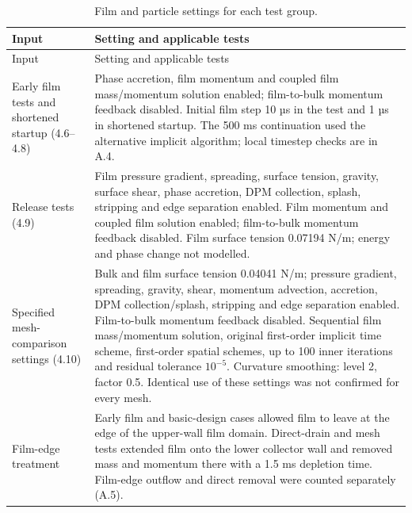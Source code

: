 \documentclass[12pt]{article}
\begin{document}
\begingroup\small\setlength{\tabcolsep}{3pt}
{
\renewcommand{\thetable}{A1c}
\begin{longtable}[]{@{}
  >{\raggedright\arraybackslash}p{}
  >{\raggedright\arraybackslash}p{}@{}}
\caption{Film and particle settings for each test group.}\label{tab:A1c}\tabularnewline
\toprule\noalign{}
\begin{minipage}[b]{\linewidth}\raggedright
Input
\end{minipage} & \begin{minipage}[b]{\linewidth}\raggedright
Setting and applicable tests
\end{minipage} \\
\midrule\noalign{}
\endfirsthead
\toprule\noalign{}
\begin{minipage}[b]{\linewidth}\raggedright
Input
\end{minipage} & \begin{minipage}[b]{\linewidth}\raggedright
Setting and applicable tests
\end{minipage} \\
\midrule\noalign{}
\endhead
\bottomrule\noalign{}
\endlastfoot
Early film tests and shortened startup (4.6--4.8) & Phase accretion, film momentum and coupled film mass/momentum solution enabled; film-to-bulk momentum feedback disabled. Initial film step 10 µs in the test and 1 µs in shortened startup. The 500 ms continuation used the alternative implicit algorithm; local timestep checks are in A.4. \\
Release tests (4.9) & Film pressure gradient, spreading, surface tension, gravity, surface shear, phase accretion, DPM collection, splash, stripping and edge separation enabled. Film momentum and coupled film solution enabled; film-to-bulk momentum feedback disabled. Film surface tension 0.07194 N/m; energy and phase change not modelled. \\
Specified mesh-comparison settings (4.10) & Bulk and film surface tension 0.04041 N/m; pressure gradient, spreading, gravity, shear, momentum advection, accretion, DPM collection/splash, stripping and edge separation enabled. Film-to-bulk momentum feedback disabled. Sequential film mass/momentum solution, original first-order implicit time scheme, first-order spatial schemes, up to 100 inner iterations and residual tolerance \(10^{-5}\). Curvature smoothing: level 2, factor 0.5. Identical use of these settings was not confirmed for every mesh. \\
Film-edge treatment & Early film and basic-design cases allowed film to leave at the edge of the upper-wall film domain. Direct-drain and mesh tests extended film onto the lower collector wall and removed mass and momentum there with a 1.5 ms depletion time. Film-edge outflow and direct removal were counted separately (A.5). \\

\end{longtable}}
\end{document}
